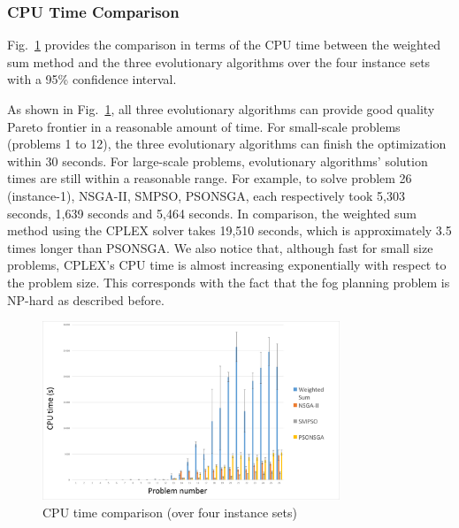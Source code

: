 \documentclass[10pt,journal,compsoc]{IEEEtran}
\newcommand{\Fig}[1]{Fig.~\ref{#1}}
\begin{document}
\begin{table}[ht]
\centering
\caption{Delay gap comparison (over four instance sets)}\label{delaygapss}
\end{table}


\subsubsection{CPU Time Comparison}
\Fig{cputimeover4} provides the comparison in terms of the CPU time between the weighted sum method and the three evolutionary algorithms over the four instance sets with a 95\% confidence interval. 

As shown in \Fig{cputimeover4}, all three evolutionary algorithms can provide good quality Pareto frontier in a reasonable amount of time. For small-scale problems (problems 1 to 12), the three evolutionary algorithms can finish the optimization within 30 seconds. For large-scale problems, evolutionary algorithms' solution times are still within a reasonable range. For example, to solve problem 26 (instance-1), NSGA-II, SMPSO, PSONSGA, each respectively took 5,303 seconds, 1,639 seconds and 5,464 seconds. In comparison, the weighted sum method using the CPLEX solver takes 19,510 seconds, which is approximately 3.5 times longer than PSONSGA. We also notice that, although fast for small size problems, CPLEX's CPU time is almost increasing exponentially with respect to the problem size. This corresponds with the fact that the fog planning problem is NP-hard as described before.

\begin{figure}[ht]
\centerline{\includegraphics[page=1,width=3.5in]{cputimeover4}}
\caption{CPU time comparison (over four instance sets)} 
\label{cputimeover4}
\end{figure}
\end{document}
